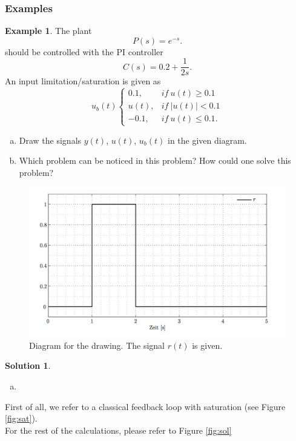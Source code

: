 \documentclass[a4paper,12 pt]{article}
\numberwithin{equation}{section}
\theoremstyle{definition}
\newtheorem{bsp}{Example}
\theoremstyle{remark}
\theoremstyle{definition}
\newtheorem*{lsg}{Solution}
\theoremstyle{definition}
\theoremstyle{definition}
\theoremstyle{remark}
\begin{document}
\subsubsection{Examples}
\begin{bsp}

The plant 
$$P(s)=e^{-s}.$$
should be controlled with the PI controller
$$C(s)=0.2+\frac{1}{2s}.$$
An input limitation/saturation is given as
\begin{equation*}
u_b(t)
\begin{cases}
0.1, &if \ u(t)\geq 0.1\\
u(t), &if \ |u(t)|<0.1\\
-0.1, &if \ u(t)\leq 0.1.
\end{cases}
\end{equation*}

\begin{enumerate}[(a)]
\item Draw the signals $y(t)$, $u(t)$, $u_b(t)$ in the given diagram.
\item Which problem can be noticed in this problem? How could one solve this problem?
\end{enumerate}

\begin{figure}[H]
\begin{center}
\includegraphics[width=0.9\columnwidth]{ex}
\end{center}
\caption{Diagram for the drawing. The signal $r(t)$ is given.}
\label{fig:osc}
\end{figure}
\newpage
\begin{lsg} 
\
\begin{enumerate}[(a)]
\item 
\end{enumerate}

First of all, we refer to a classical feedback loop with saturation (see Figure \ref{fig:sat}). \\ For the rest of the calculations, please refer to Figure \ref{fig:sol}
\end{lsg}




\end{bsp}
\end{document}
